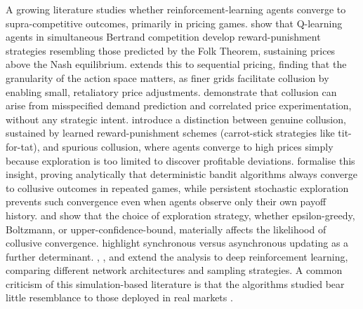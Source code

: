 A growing literature studies whether reinforcement-learning agents converge to supra-competitive outcomes, primarily in pricing games. \citet{Calvano2020} show that Q-learning agents in simultaneous Bertrand competition develop reward-punishment strategies resembling those predicted by the Folk Theorem, sustaining prices above the Nash equilibrium. \citet{Klein2021} extends this to sequential pricing, finding that the granularity of the action space matters, as finer grids facilitate collusion by enabling small, retaliatory price adjustments. \citet{Hansen2021} demonstrate that collusion can arise from misspecified demand prediction and correlated price experimentation, without any strategic intent. \citet{Calvano2023} introduce a distinction between genuine collusion, sustained by learned reward-punishment schemes (carrot-stick strategies like tit-for-tat), and spurious collusion, where agents converge to high prices simply because exploration is too limited to discover profitable deviations. \citet{Douglas2024} formalise this insight, proving analytically that deterministic bandit algorithms always converge to collusive outcomes in repeated games, while persistent stochastic exploration prevents such convergence even when agents observe only their own payoff history. \citet{Abada2022} and \citet{Dolgopolov2021} show that the choice of exploration strategy, whether epsilon-greedy, Boltzmann, or upper-confidence-bound, materially affects the likelihood of collusive convergence. \citet{Asker2022} highlight synchronous versus asynchronous updating as a further determinant. \citet{Hettich2021}, \citet{Han2022}, and \citet{Zhang2021} extend the analysis to deep reinforcement learning, comparing different network architectures and sampling strategies. A common criticism of this simulation-based literature is that the algorithms studied bear little resemblance to those deployed in real markets \citep{KuhnTadelis2017, Schwalbe2018}.

